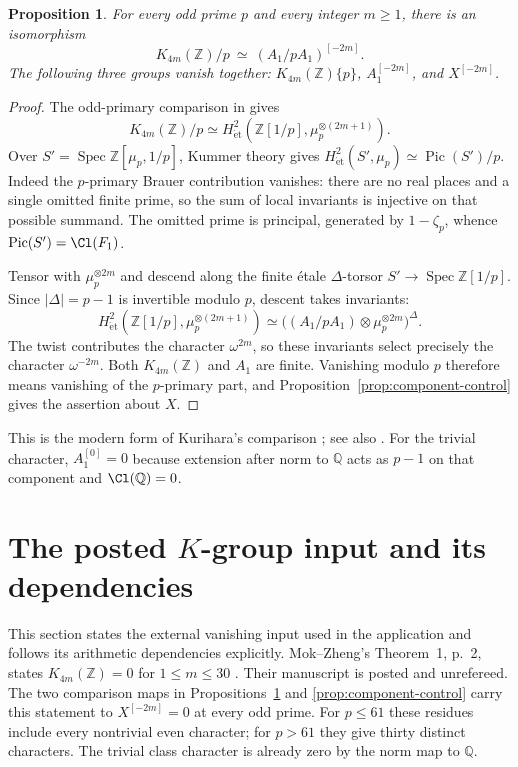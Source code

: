 \documentclass[11pt]{article}
\newtheorem{proposition}[theorem]{Proposition}
\theoremstyle{definition}\newtheorem{definition}[theorem]{Definition}
\newcommand{\Z}{\mathbb Z}\newcommand{\Q}{\mathbb Q}
\begin{document}
\begin{proposition}\label{prop:k-component}
For every odd prime $p$ and every integer $m\geq1$, there is an
isomorphism
\[
 K_{4m}(\Z)/p\ \simeq\ (A_1/pA_1)^{[-2m]}.
\]
The following three groups vanish together:
$K_{4m}(\Z)\{p\}$, $A_1^{[-2m]}$, and $X^{[-2m]}$.
\end{proposition}
\begin{proof}
The odd-primary comparison in \cite[VI, Corollary~8.3]{Weibel}
gives
\[
 K_{4m}(\Z)/p\simeq
 H^2_{\mathrm{\acute et}}(\Z[1/p],\mu_p^{\otimes(2m+1)}).
\]
Over $S'=\operatorname{Spec}\Z[\mu_p,1/p]$, Kummer theory gives
$H^2_{\mathrm{\acute et}}(S',\mu_p)\simeq\operatorname{Pic}(S')/p$.
Indeed the $p$-primary Brauer contribution vanishes: there are no
real places and a single omitted finite prime, so the sum of local
invariants is injective on that possible summand. The omitted prime
is principal, generated by $1-\zeta_p$, whence
$\operatorname{Pic}(S')=\Cl(F_1)$.

Tensor with $\mu_p^{\otimes2m}$ and descend along the finite
\'etale $\Delta$-torsor $S'\to\operatorname{Spec}\Z[1/p]$.
Since $|\Delta|=p-1$ is invertible modulo $p$, descent takes invariants:
\[
 H^2_{\mathrm{\acute et}}(\Z[1/p],\mu_p^{\otimes(2m+1)})
 \simeq\bigl((A_1/pA_1)\otimes\mu_p^{\otimes2m}\bigr)^\Delta.
\]
The twist contributes the character $\omega^{2m}$, so these invariants
select precisely the character $\omega^{-2m}$. Both $K_{4m}(\Z)$
and $A_1$ are finite. Vanishing modulo $p$ therefore means vanishing
of the $p$-primary part, and Proposition~\ref{prop:component-control}
gives the assertion about $X$.
\end{proof}
This is the modern form of Kurihara's comparison
\cite[Corollary~1.5, Proposition~3.7 and Remark~3.11]{Kurihara};
see also \cite[VI, Theorem~10.9]{Weibel}. For the trivial character,
$A_1^{[0]}=0$ because extension after norm to $\Q$ acts as $p-1$
on that component and $\Cl(\Q)=0$.

\section{The posted $K$-group input and its dependencies}
\label{sec:dependencies}

This section states the external vanishing input used in the
application and follows its arithmetic dependencies explicitly.
Mok--Zheng's Theorem~1, p.~2, states
$K_{4m}(\mathbb Z)=0$ for $1\leq m\leq30$ \cite{MZ}.
Their manuscript is posted and unrefereed. The two comparison
maps in Propositions~\ref{prop:k-component} and
\ref{prop:component-control} carry this statement to
$X^{[-2m]}=0$ at every odd prime. For $p\leq61$ these residues
include every nontrivial even character; for $p>61$ they give
thirty distinct characters. The trivial class character is
already zero by the norm map to $\mathbb Q$.
\end{document}
